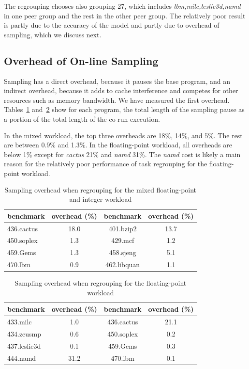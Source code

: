 The regrouping chooses also grouping 27, which includes
\emph{lbm,milc,leslie3d,namd} in one peer group and the rest in the
other peer group.  The relatively poor result is partly due to the
accuracy of the model and partly due to overhead of sampling, which we
discuss next.

\subsection{Overhead of On-line Sampling}

Sampling has a direct overhead, because it pauses the base program,
and an indirect overhead, because it adds to cache interference and
competes for other resources such as memory bandwidth.  We
have measured the first overhead.  Tables~\ref{tbl:mix_overhead}
and~\ref{tbl:fp_overhead} show for each program, the total length of
the sampling pause as a portion of the total length of the co-run
execution. 

In the mixed workload, the top three overheads are 18\%, 14\%, and
5\%.  The rest are between 0.9\% and 1.3\%.  In the floating-point
workload, all overheads are below 1\% except for \emph{cactus} 21\%
and \emph{namd} 31\%.  The \emph{namd} cost is likely a main reason
for the relatively poor performance of task regrouping for the
floating-point workload.  

\begin{table}[t!]
\centering
\small
\begin{tabular}{|l|c|c|c|}
\hline
benchmark & overhead (\%) & benchmark & overhead (\%) \\ \hline \hline
436.cactus &18.0& 401.bzip2&13.7 \\ \hline
450.soplex &1.3& 429.mcf&1.2 \\ \hline
459.Gems &1.3& 458.sjeng&5.1 \\ \hline
470.lbm &0.9& 462.libquan&1.1 \\ \hline
\end{tabular}
\caption{Sampling overhead when regrouping for the mixed
  floating-point and integer workload}
\label{tbl:mix_overhead}
\end{table}

\begin{table}[t!]
\centering
\small
\begin{tabular}{|l|c|c|c|}
\hline
benchmark & overhead (\%) & benchmark & overhead (\%) \\ \hline \hline
433.milc & 1.0 &436.cactus &21.1 \\ \hline
434.zeusmp &0.6 &450.soplex &0.2 \\ \hline
437.leslie3d &0.1& 459.Gems &0.3 \\ \hline
444.namd &31.2& 470.lbm &0.1 \\ \hline
\end{tabular}
\caption{Sampling overhead when regrouping for the floating-point workload}
\label{tbl:fp_overhead}
\end{table}

